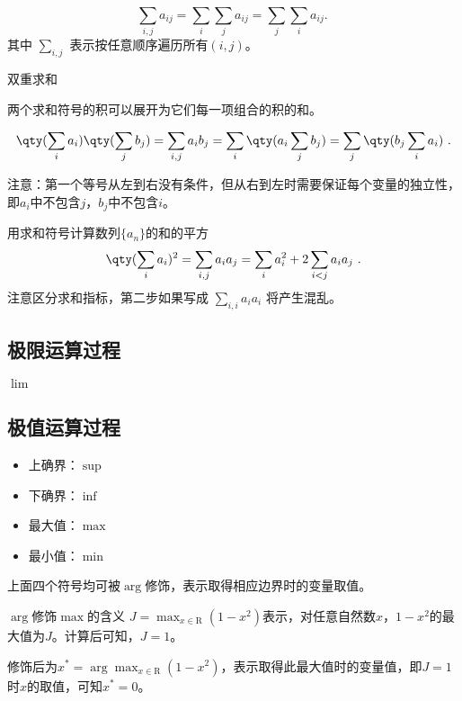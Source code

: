 \begin{equation}
\sum_{i,j} a_{ij}=\sum_{i} \sum_{j} a_{ij} = \sum_{j} \sum_{i} a_{ij}.~
\end{equation}
其中 $\sum\limits_{i,j}$ 表示按任意顺序遍历所有$(i,j)$。

双重求和

两个求和符号的积可以展开为它们每一项组合的积的和。

\begin{equation}
\qty(\sum_i a_i) \qty(\sum_j b_j) = \sum_{i,j} a_i b_j = \sum_i \qty(a_i \sum_j b_j) = \sum_j \qty(b_j \sum_i a_i)~.
\end{equation}

注意：第一个等号从左到右没有条件，但从右到左时需要保证每个变量的独立性，即$a_i$中不包含$j$，$b_j$中不包含$i$。

\begin{example}{用求和符号计算数列$\{a_n\}$的和的平方}
$$\qty(\sum_i a_i)^2 = \sum_{i,j} a_i a_j = \sum_i a_i^2 + 2\sum_{i<j} a_i a_j~.$$
注意区分求和指标，第二步如果写成 $\sum\limits_{i,i} a_i a_i$ 将产生混乱。
\end{example}
\subsection{极限运算过程}

$\lim$

\subsection{极值运算过程}

\begin{itemize}
\item 上确界：$\sup$
\item 下确界：$\inf$
\item 最大值：$\max$
\item 最小值：$\min$
\end{itemize}

上面四个符号均可被$\arg$修饰，表示取得相应边界时的变量取值。

\begin{example}{$\arg$修饰$\max$的含义}
$J=\displaystyle\max_{x\in{\mathrm R}} (1-x^2)$表示，对任意自然数$x$，$1-x^2$的最大值为$J$。计算后可知，$J=1$。

修饰后为$x^*=\displaystyle\arg\max_{x\in{\mathrm R}} (1-x^2)$，表示取得此最大值时的变量值，即$J=1$时$x$的取值，可知$x^*=0$。
\end{example}
